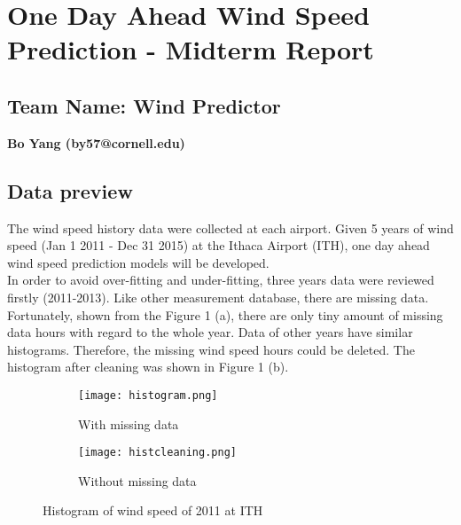 \documentclass{article}
\begin{document}
\section*{One Day Ahead Wind Speed Prediction - Midterm Report}
\subsection*{Team Name: Wind Predictor} 
{\bf Bo Yang (by57@cornell.edu)}\\
\subsection*{Data preview}
The wind speed history data were collected at each airport.  
Given 5 years of wind speed (Jan 1 2011 - Dec 31 2015) at the Ithaca Airport (ITH), one day ahead wind speed prediction models will be developed.\\
In order to avoid over-fitting and under-fitting, three years data were reviewed firstly (2011-2013). 
Like other measurement database, there are missing data.   Fortunately, shown from the Figure 1 (a), 
there are only tiny amount of missing data hours with regard to the whole year.
Data of other years have similar histograms.  Therefore, the missing wind speed hours could be deleted. 
The histogram after cleaning was shown in Figure 1 (b).\\
\begin{figure}[h]
  \begin{subfigure}[b]{0.5\textwidth}
    \texttt{[image: histogram.png]}
    \caption{With missing data}
    \label{fig:f1}
  \end{subfigure}
  \hfill
  \begin{subfigure}[b]{0.5\textwidth}
    \texttt{[image: histcleaning.png]}
    \caption{Without missing data}
    \label{fig:f2}
  \end{subfigure}
  \caption{Histogram of wind speed of 2011 at ITH}
\end{figure}
\end{document}
